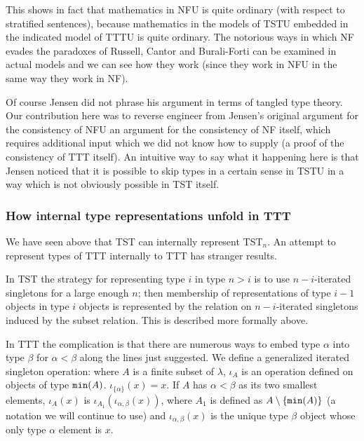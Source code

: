 \documentclass[12pt]{article}
\begin{document}
\begin{description}
This shows in fact that mathematics in NFU is quite ordinary (with respect to stratified sentences), because mathematics in the models of TSTU embedded in the indicated model of TTTU is quite ordinary.  The notorious ways in which NF evades the paradoxes of Russell, Cantor and Burali-Forti can be examined in actual models and we can see how they work (since they work in NFU in the same way they work in NF).

\end{description}

Of course Jensen did not phrase his argument in terms of tangled type theory.  Our contribution here was to reverse engineer from Jensen's original argument for the consistency of NFU an argument for the consistency of NF itself, which requires additional input which we did not know how to supply (a proof of the consistency of TTT itself).  An intuitive way to say what it happening here is that Jensen noticed that it is possible to skip types in a certain sense in TSTU in a way which is not obviously possible in TST itself.

\subsubsection{How internal type representations unfold in TTT}

We have seen above that TST can internally represent TST$_n$.   An attempt to represent types of TTT internally to TTT has stranger results.

In TST the strategy for representing type $i$ in type $n>i$  is to use $n-i$-iterated singletons for a large enough $n$;  then membership of representations of type $i-1$ objects in type
$i$ objects is represented by the relation on $n-i$-iterated singletons induced by the subset relation.  This is described more formally above.

In TTT the complication is that there are numerous ways to embed type $\alpha$ into type $\beta$ for $\alpha<\beta$ along the lines just suggested.    We define a generalized
iterated singleton operation:  where $A$ is a finite subset of $\lambda$, $\iota_A$ is an operation defined on objects of type ${\tt min}(A)$.  $\iota_{\{\alpha\}}(x)=x$.
If $A$ has $\alpha<\beta$ as its two smallest elements, $\iota_A(x)$ is  $\iota_{A_1}(\iota_{\alpha,\beta}(x))$, where $A_1$ is defined as $A \setminus \{{\tt min}(A)\}$ (a notation we will continue to use) and $\iota_{\alpha,\beta}(x)$ is the unique type $\beta$ object whose only type $\alpha$ element is $x$.
\end{document}

